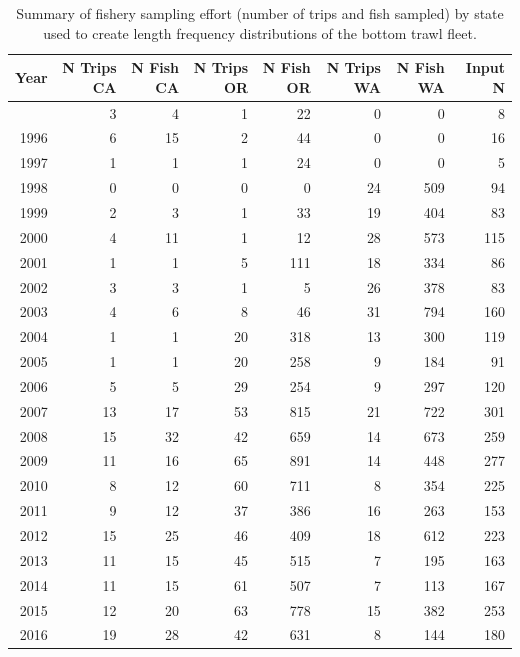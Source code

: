 \documentclass[
]{article}
\begin{document}
\endgroup

\newpage{}

\begingroup
\fontsize{9.0pt}{11.0pt}\selectfont

\begin{longtable}{rrrrrrrr}

\caption{\label{tbl-BT_lengths_sample_sizes}Summary of fishery sampling
effort (number of trips and fish sampled) by state used to create length
frequency distributions of the bottom trawl fleet.}

\tabularnewline

\toprule
Year & N Trips CA & N Fish CA & N Trips OR & N Fish OR & N Trips WA & N Fish WA & Input N \\ 
\midrule\addlinespace[2.5pt]
1995 & 3 & 4 & 1 & 22 & 0 & 0 & 8 \\ 
1996 & 6 & 15 & 2 & 44 & 0 & 0 & 16 \\ 
1997 & 1 & 1 & 1 & 24 & 0 & 0 & 5 \\ 
1998 & 0 & 0 & 0 & 0 & 24 & 509 & 94 \\ 
1999 & 2 & 3 & 1 & 33 & 19 & 404 & 83 \\ 
2000 & 4 & 11 & 1 & 12 & 28 & 573 & 115 \\ 
2001 & 1 & 1 & 5 & 111 & 18 & 334 & 86 \\ 
2002 & 3 & 3 & 1 & 5 & 26 & 378 & 83 \\ 
2003 & 4 & 6 & 8 & 46 & 31 & 794 & 160 \\ 
2004 & 1 & 1 & 20 & 318 & 13 & 300 & 119 \\ 
2005 & 1 & 1 & 20 & 258 & 9 & 184 & 91 \\ 
2006 & 5 & 5 & 29 & 254 & 9 & 297 & 120 \\ 
2007 & 13 & 17 & 53 & 815 & 21 & 722 & 301 \\ 
2008 & 15 & 32 & 42 & 659 & 14 & 673 & 259 \\ 
2009 & 11 & 16 & 65 & 891 & 14 & 448 & 277 \\ 
2010 & 8 & 12 & 60 & 711 & 8 & 354 & 225 \\ 
2011 & 9 & 12 & 37 & 386 & 16 & 263 & 153 \\ 
2012 & 15 & 25 & 46 & 409 & 18 & 612 & 223 \\ 
2013 & 11 & 15 & 45 & 515 & 7 & 195 & 163 \\ 
2014 & 11 & 15 & 61 & 507 & 7 & 113 & 167 \\ 
2015 & 12 & 20 & 63 & 778 & 15 & 382 & 253 \\ 
2016 & 19 & 28 & 42 & 631 & 8 & 144 & 180 \\ 

\end{longtable}
\end{document}
